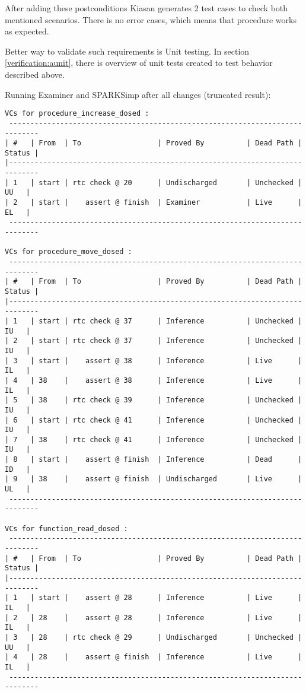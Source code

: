 After adding these postconditions Kiasan generates 2 test cases to check both mentioned scenarios. There is no error cases, which means that procedure works as expected.

Better way to validate such requirements is Unit testing. In section \ref{verification:aunit}, there is overview of unit tests created to test behavior described above.

Running Examiner and SPARKSimp after all changes (truncated result):

\begin{lstlisting}[frame=single, gobble=0, caption={Third POGS report}, label={listing:pcapump_dosemonitor_pogs3}]
VCs for procedure_increase_dosed :
 -----------------------------------------------------------------------------
| #   | From  | To                  | Proved By          | Dead Path | Status |
|-----------------------------------------------------------------------------
| 1   | start | rtc check @ 20      | Undischarged       | Unchecked |   UU   |
| 2   | start |    assert @ finish  | Examiner           | Live      |   EL   |
 -----------------------------------------------------------------------------

VCs for procedure_move_dosed :
 -----------------------------------------------------------------------------
| #   | From  | To                  | Proved By          | Dead Path | Status |
|-----------------------------------------------------------------------------
| 1   | start | rtc check @ 37      | Inference          | Unchecked |   IU   |
| 2   | start | rtc check @ 37      | Inference          | Unchecked |   IU   |
| 3   | start |    assert @ 38      | Inference          | Live      |   IL   |
| 4   | 38    |    assert @ 38      | Inference          | Live      |   IL   |
| 5   | 38    | rtc check @ 39      | Inference          | Unchecked |   IU   |
| 6   | start | rtc check @ 41      | Inference          | Unchecked |   IU   |
| 7   | 38    | rtc check @ 41      | Inference          | Unchecked |   IU   |
| 8   | start |    assert @ finish  | Inference          | Dead      |   ID   |
| 9   | 38    |    assert @ finish  | Undischarged       | Live      |   UL   |
 -----------------------------------------------------------------------------

VCs for function_read_dosed :
 -----------------------------------------------------------------------------
| #   | From  | To                  | Proved By          | Dead Path | Status |
|-----------------------------------------------------------------------------
| 1   | start |    assert @ 28      | Inference          | Live      |   IL   |
| 2   | 28    |    assert @ 28      | Inference          | Live      |   IL   |
| 3   | 28    | rtc check @ 29      | Undischarged       | Unchecked |   UU   |
| 4   | 28    |    assert @ finish  | Inference          | Live      |   IL   |
 -----------------------------------------------------------------------------


\end{lstlisting}
